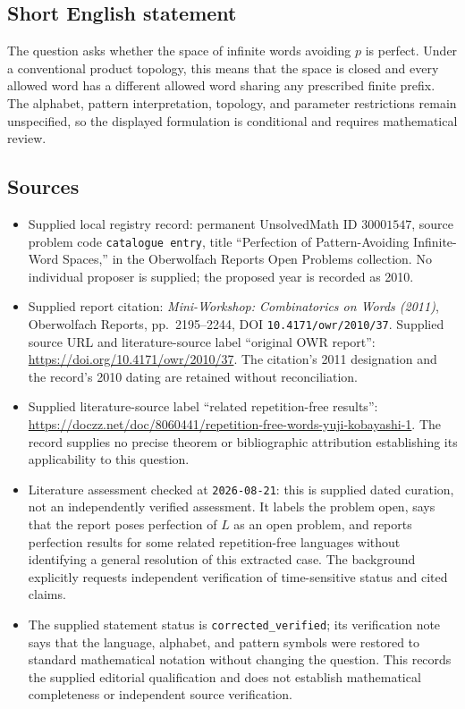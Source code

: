 \documentclass[11pt]{article}
\begin{document}
\subsection{Short English statement}
The question asks whether the space of infinite words avoiding \(p\) is perfect. Under a conventional product topology, this means that the space is closed and every allowed word has a different allowed word sharing any prescribed finite prefix. The alphabet, pattern interpretation, topology, and parameter restrictions remain unspecified, so the displayed formulation is conditional and requires mathematical review.
\subsection{Sources}
\begin{itemize}
\item Supplied local registry record: permanent UnsolvedMath ID \(30001547\), source problem code \texttt{catalogue entry}, title ``Perfection of Pattern-Avoiding Infinite-Word Spaces,'' in the Oberwolfach Reports Open Problems collection. No individual proposer is supplied; the proposed year is recorded as 2010.
\item Supplied report citation: \emph{Mini-Workshop: Combinatorics on Words (2011)}, Oberwolfach Reports, pp.~2195--2244, DOI \texttt{10.4171/owr/2010/37}. Supplied source URL and literature-source label ``original OWR report'': \url{https://doi.org/10.4171/owr/2010/37}. The citation's 2011 designation and the record's 2010 dating are retained without reconciliation.
\item Supplied literature-source label ``related repetition-free results'': \url{https://doczz.net/doc/8060441/repetition-free-words-yuji-kobayashi-1}. The record supplies no precise theorem or bibliographic attribution establishing its applicability to this question.
\item Literature assessment checked at \texttt{2026-08-21}: this is supplied dated curation, not an independently verified assessment. It labels the problem open, says that the report poses perfection of \(L\) as an open problem, and reports perfection results for some related repetition-free languages without identifying a general resolution of this extracted case. The background explicitly requests independent verification of time-sensitive status and cited claims.
\item The supplied statement status is \texttt{corrected\_verified}; its verification note says that the language, alphabet, and pattern symbols were restored to standard mathematical notation without changing the question. This records the supplied editorial qualification and does not establish mathematical completeness or independent source verification.
\end{itemize}
\end{document}
